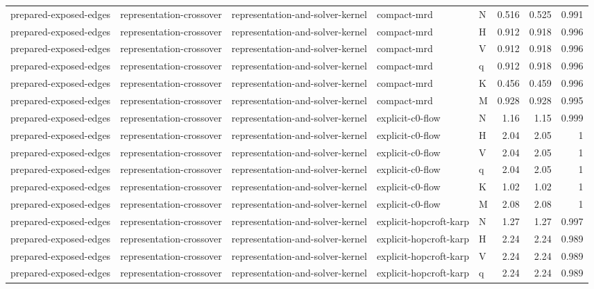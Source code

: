 \begin{table}[t]
\begin{tabular}{lllllrrr}
prepared-exposed-edges & representation-crossover & representation-and-solver-kernel & compact-mrd & N & 0.516 & 0.525 & 0.991 \\
prepared-exposed-edges & representation-crossover & representation-and-solver-kernel & compact-mrd & H & 0.912 & 0.918 & 0.996 \\
prepared-exposed-edges & representation-crossover & representation-and-solver-kernel & compact-mrd & V & 0.912 & 0.918 & 0.996 \\
prepared-exposed-edges & representation-crossover & representation-and-solver-kernel & compact-mrd & q & 0.912 & 0.918 & 0.996 \\
prepared-exposed-edges & representation-crossover & representation-and-solver-kernel & compact-mrd & K & 0.456 & 0.459 & 0.996 \\
prepared-exposed-edges & representation-crossover & representation-and-solver-kernel & compact-mrd & M & 0.928 & 0.928 & 0.995 \\
prepared-exposed-edges & representation-crossover & representation-and-solver-kernel & explicit-c0-flow & N & 1.16 & 1.15 & 0.999 \\
prepared-exposed-edges & representation-crossover & representation-and-solver-kernel & explicit-c0-flow & H & 2.04 & 2.05 & 1 \\
prepared-exposed-edges & representation-crossover & representation-and-solver-kernel & explicit-c0-flow & V & 2.04 & 2.05 & 1 \\
prepared-exposed-edges & representation-crossover & representation-and-solver-kernel & explicit-c0-flow & q & 2.04 & 2.05 & 1 \\
prepared-exposed-edges & representation-crossover & representation-and-solver-kernel & explicit-c0-flow & K & 1.02 & 1.02 & 1 \\
prepared-exposed-edges & representation-crossover & representation-and-solver-kernel & explicit-c0-flow & M & 2.08 & 2.08 & 1 \\
prepared-exposed-edges & representation-crossover & representation-and-solver-kernel & explicit-hopcroft-karp & N & 1.27 & 1.27 & 0.997 \\
prepared-exposed-edges & representation-crossover & representation-and-solver-kernel & explicit-hopcroft-karp & H & 2.24 & 2.24 & 0.989 \\
prepared-exposed-edges & representation-crossover & representation-and-solver-kernel & explicit-hopcroft-karp & V & 2.24 & 2.24 & 0.989 \\
prepared-exposed-edges & representation-crossover & representation-and-solver-kernel & explicit-hopcroft-karp & q & 2.24 & 2.24 & 0.989 \\

\end{tabular}
\end{table}
